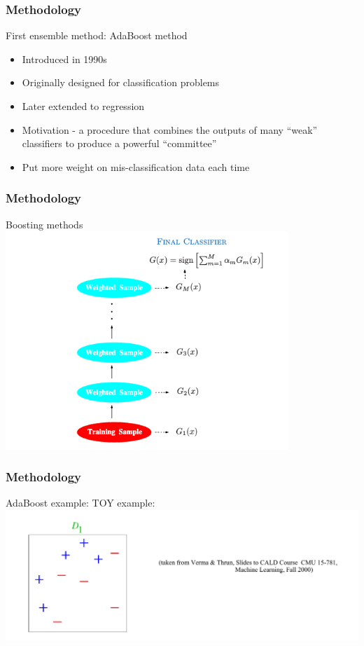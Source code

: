 \documentclass[xcolor={x11names,svgnames,dvipsnames}]{beamer}
\begin{document}
\begin{frame}
	\frametitle{Methodology}
	\begin{block}{First ensemble method: AdaBoost method}
	  \begin{itemize}
	  \item Introduced in 1990s
	  \item Originally designed for classification problems
	  \item Later extended to regression
	  \item Motivation - a procedure that \alert{combines the outputs of many “weak” classifiers to produce a powerful “committee”}	 
	  \item Put more weight on mis-classification data each time  
	  \end{itemize}
	\end{block}
\end{frame}



\begin{frame}
	\frametitle{Methodology}
	\begin{block}{Boosting methods}
      \includegraphics[width=0.8\textwidth, height=0.7\textheight]{boosting.png}
	\end{block}	
\end{frame}


\begin{frame}
	\frametitle{Methodology}
	\begin{block}{AdaBoost example: TOY example:}
      \includegraphics[width=1\textwidth, height=0.5\textheight]{toy_example.png}
	\end{block}	
\end{frame}
\end{document}
